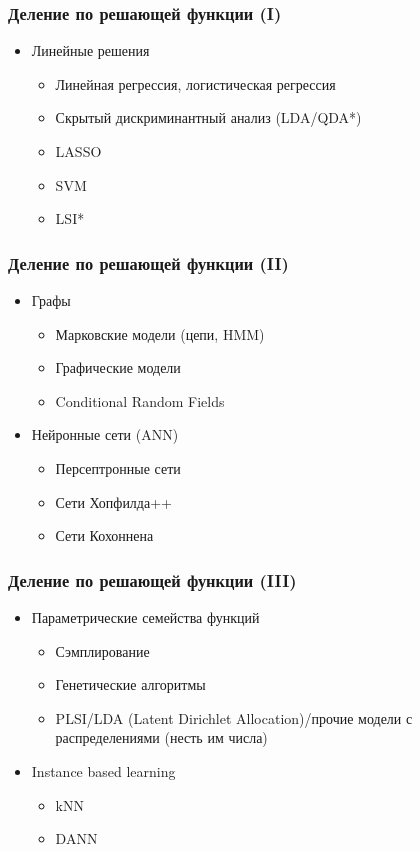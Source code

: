 \documentclass[14pt, fleqn, xcolor={dvipsnames, table}]{beamer}
\begin{document}
\begin{frame}
\frametitle{Деление по решающей функции (I)}
\begin{itemize}
\item Линейные решения 
	\begin{itemize}
	\item Линейная регрессия, логистическая регрессия
	\item Скрытый дискриминантный анализ (LDA/QDA*)
	\item LASSO
	\item SVM
	\item LSI*
	\end{itemize}
\end{itemize}
\end{frame}

\begin{frame}
\frametitle{Деление по решающей функции (II)}
\begin{itemize}
\item Графы
\begin{itemize}
	\item Марковские модели (цепи, HMM)
	\item Графические модели
	\item Conditional Random Fields
\end{itemize}
\item Нейронные сети (ANN)
\begin{itemize}
	\item Персептронные сети
	\item Сети Хопфилда++
	\item Сети Кохоннена
\end{itemize}
\end{itemize}
\end{frame}

\begin{frame}
\frametitle{Деление по решающей функции (III)}
\begin{itemize}
\item Параметрические семейства функций
	\begin{itemize}
		\item Сэмплирование
		\item Генетические алгоритмы
		\item PLSI/LDA (Latent Dirichlet Allocation)/прочие модели с распределениями (несть им числа)
	\end{itemize}
\item Instance based learning
	\begin{itemize}
		\item kNN
		\item DANN
	\end{itemize}
\end{itemize}
\end{frame}
\end{document}
